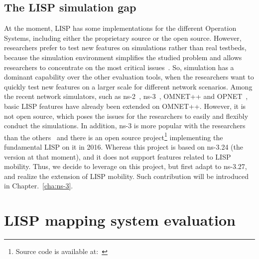 \subsection{The LISP simulation gap}
\label{subsec:implementation_missing}
At the moment, LISP has some implementations for the different Operation Systems, including either the proprietary source or the open source. However, researchers prefer to test new features on simulations rather than real testbeds, because the simulation environment simplifies the studied problem and allows researchers to concentrate on the most critical issues~\cite{moller2011simulation}. So, simulation has a dominant capability over the other evaluation tools, when the researchers want to quickly test new features on a larger scale for different network scenarios. Among the recent network simulators, such as ns-2~\cite{breslau2000advances}, ns-3~\cite{henderson2008network}, OMNET++ and OPNET~\cite{chang1999network}, basic LISP features have already been extended on OMNET++. However, it is not open source, which poses the issues for the researchers to easily and flexibly conduct the simulations. In addition, ns-3 is more popular with the researchers than the others~\cite{rana2017implementation} and there is an open source project\footnote{Source code is available at:~\cite{lionel}} implementing the fundamental LISP on it in 2016. Whereas this project is based on ns-3.24 (the version at that moment), and it does not support features related to LISP mobility. Thus, we decide to leverage on this project, but first adapt to ns-3.27, and realize the extension of LISP mobility. Such contribution will be introduced in Chapter.~\ref{cha:ns-3}. 

\section{LISP mapping system evaluation}
\label{sec:mds}

